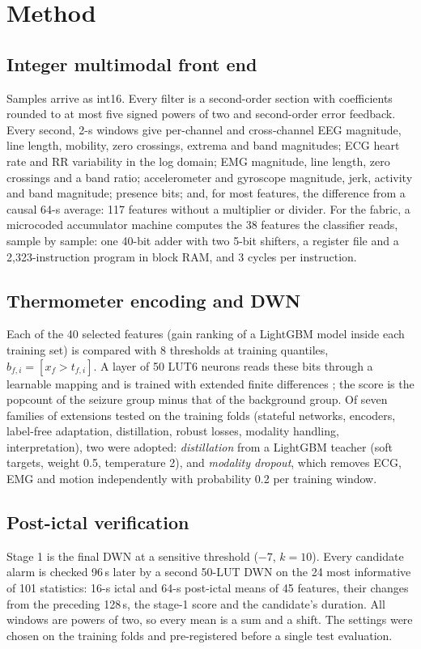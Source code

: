 \documentclass[conference]{IEEEtran}
\begin{document}
\section{Method}
\subsection{Integer multimodal front end}
Samples arrive as int16. Every filter is a second-order section with coefficients rounded to at most five signed
powers of two and second-order error feedback. Every second, 2-s windows give per-channel and cross-channel EEG
magnitude, line length, mobility, zero crossings, extrema and band magnitudes; ECG heart rate and RR variability in
the log domain; EMG magnitude, line length, zero crossings and a band ratio; accelerometer and gyroscope magnitude,
jerk, activity and band magnitude; presence bits; and, for most features, the difference from a causal 64-s average:
117 features without a multiplier or divider. For the fabric, a microcoded accumulator machine computes the 38
features the classifier reads, sample by sample: one 40-bit adder with two 5-bit shifters, a register file and a
2,323-instruction program in block RAM, and 3 cycles per instruction.

\subsection{Thermometer encoding and DWN}
Each of the 40 selected features (gain ranking of a LightGBM model inside each training set) is compared with 8
thresholds at training quantiles, $b_{f,i} = [x_f > t_{f,i}]$. A layer of 50 LUT6 neurons reads these bits through a
learnable mapping and is trained with extended finite differences \cite{bacellar2024dwn}; the score is the popcount of
the seizure group minus that of the background group. Of seven families of extensions tested on the training folds
(stateful networks, encoders, label-free adaptation, distillation, robust losses, modality handling, interpretation),
two were adopted: \emph{distillation} from a LightGBM teacher (soft targets, weight 0.5, temperature 2), and
\emph{modality dropout}, which removes ECG, EMG and motion independently with probability 0.2 per training window.

\subsection{Post-ictal verification}
Stage 1 is the final DWN at a sensitive threshold ($-7$, $k = 10$). Every candidate alarm is checked 96\,s later by a
second 50-LUT DWN on the 24 most informative of 101 statistics: 16-s ictal and 64-s post-ictal means of 45 features,
their changes from the preceding 128\,s, the stage-1 score and the candidate's duration. All windows are powers of two,
so every mean is a sum and a shift. The settings were chosen on the training folds and pre-registered before a single
test evaluation.
\end{document}
